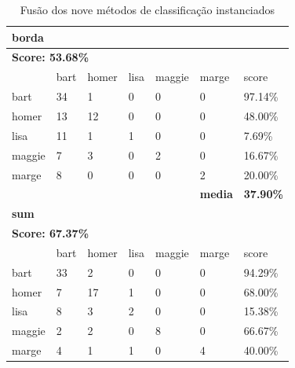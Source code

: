\documentclass[paper=a4, fontsize=11pt]{scrartcl} %
\numberwithin{equation}{section} %
\numberwithin{figure}{section} %
\numberwithin{table}{section} %
\begin{document}
\begin{table}[]
\centering
\caption{Fusão dos nove métodos de classificação instanciados}
\label{tbl:fusionall}
\begin{tabular}{l|l|l|l|l|l|l}
\hline
\multicolumn{7}{l}{\textbf{borda}}                                                          \\ \hline
\multicolumn{7}{l}{\textbf{Score: 53.68\%}}                                                 \\ \hline
          & bart      & homer     & lisa      & maggie    & marge          & score            \\ \hline
bart      & 34        & 1         & 0         & 0         & 0              & 97.14\%          \\ \hline
homer     & 13        & 12        & 0         & 0         & 0              & 48.00\%          \\ \hline
lisa      & 11        & 1         & 1         & 0         & 0              & 7.69\%           \\ \hline
maggie    & 7         & 3         & 0         & 2         & 0              & 16.67\%          \\ \hline
marge     & 8         & 0         & 0         & 0         & 2              & 20.00\%          \\ \hline
\textbf{} & \textbf{} & \textbf{} & \textbf{} & \textbf{} & \textbf{media} & \textbf{37.90\%} \\ \hline
\multicolumn{7}{l}{\textbf{sum}}                                                            \\ \hline
\multicolumn{7}{l}{\textbf{Score: 67.37\%}}                                                 \\ \hline
          & bart      & homer     & lisa      & maggie    & marge          & score            \\ \hline
bart      & 33        & 2         & 0         & 0         & 0              & 94.29\%          \\ \hline
homer     & 7         & 17        & 1         & 0         & 0              & 68.00\%          \\ \hline
lisa      & 8         & 3         & 2         & 0         & 0              & 15.38\%          \\ \hline
maggie    & 2         & 2         & 0         & 8         & 0              & 66.67\%          \\ \hline
marge     & 4         & 1         & 1         & 0         & 4              & 40.00\%          \\ \hline

\end{tabular}
\end{table}
\end{document}
